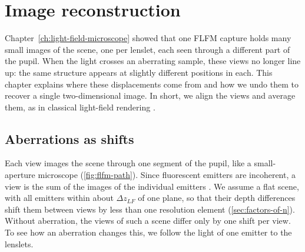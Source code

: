 \chapter{Image reconstruction}
\label{ch:image-reconstruction}

\begingroup
\raggedbottom


Chapter~\ref{ch:light-field-microscope} showed that one FLFM capture holds many small images of the scene, one per lenslet, each seen through a different part of the pupil. When the light crosses an aberrating sample, these views no longer line up: the same structure appears at slightly different positions in each. This chapter explains where these displacements come from and how we undo them to recover a single two-dimensional image. In short, we align the views and average them, as in classical light-field rendering \cite{levoyHanrahan1996lightFieldRendering}.

\section{Aberrations as shifts}
\label{sec:aberrations-as-shifts}

Each view images the scene through one segment of the pupil, like a small-aperture microscope (\cref{fig:flfm-path}). Since fluorescent emitters are incoherent, a view is the sum of the images of the individual emitters \cite{guo2019fourierLightField}. We assume a flat scene, with all emitters within about $\Delta z_{LF}$ of one plane, so that their depth differences shift them between views by less than one resolution element (\cref{sec:factors-of-n}). Without aberration, the views of such a scene differ only by one shift per view. To see how an aberration changes this, we follow the light of one emitter to the lenslets.

